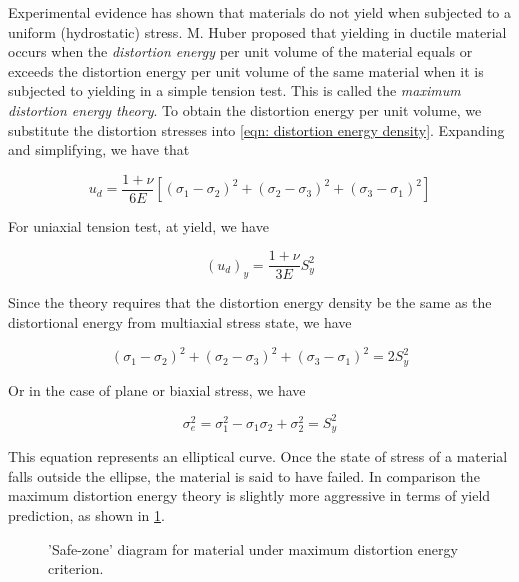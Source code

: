 \documentclass[a4paper,openany,12pt]{book}
\begin{document}
Experimental evidence has shown that materials do not yield when
subjected to a uniform (hydrostatic) stress. M. Huber proposed that
yielding in ductile material occurs when the \emph{distortion energy} per
unit volume of the material equals or exceeds the distortion energy per
unit volume of the same material when it is subjected to yielding in a
simple tension test. This is called the \emph{maximum distortion energy
theory}. To obtain the distortion energy per unit volume, we substitute
the distortion stresses into
\ref{eqn: distortion energy density}.
Expanding and simplifying, we have that

$$u_d = \frac{1 + \nu}{6E}\left[ (\sigma_1 - \sigma_2)^2 + (\sigma _2 - \sigma_3)^2 + (\sigma_3 - \sigma_1)^2 \right]$$

For uniaxial tension test, at yield, we have

$$(u_d)_y = \frac{1 + \nu}{3E}S_y^2$$

Since the theory requires that the distortion energy density be the same
as the distortional energy from multiaxial stress state, we have

$$(\sigma_1 - \sigma_2)^2 + (\sigma_2 - \sigma_3)^2 + (\sigma_3 - \sigma_1)^2 = 2S_y^2$$

Or in the case of plane or biaxial stress, we have

$$\sigma_e^2 = \sigma_1^2 - \sigma_1\sigma_2 + \sigma_2^2 = S_y^2$$

This equation represents an elliptical curve. Once the state of stress
of a material falls outside the ellipse, the material is said to have
failed. In comparison the maximum distortion energy theory is slightly
more aggressive in terms of yield prediction, as shown in
\ref{fig: MDET safe zone}.

\begin{figure}[h]
  \centering
  \caption{'Safe-zone' diagram for material under maximum distortion energy criterion.}
  \label{fig: MDET safe zone}
\end{figure}
\end{document}
